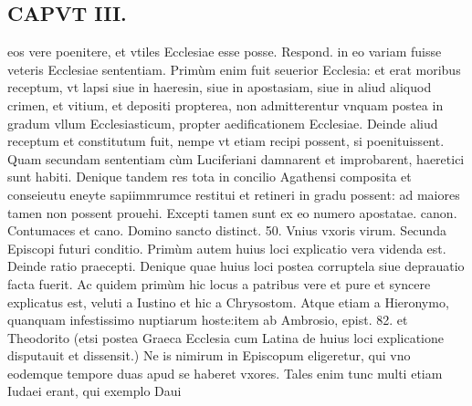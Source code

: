 \documentclass{article}
\begin{document}
\begin{pages}
\section*{CAPVT  III. }
\marginpar{[ p.105 ]}\pstart eos vere poenitere, et vtiles Ecclesiae esse posse. Respond. in eo variam fuisse veteris Ecclesiae sententiam. Primùm enim fuit seuerior Ecclesia: et erat moribus receptum, vt lapsi siue in haeresin, siue in apostasiam, siue in aliud aliquod crimen, et vitium, et depositi propterea, non admitterentur vnquam postea in gradum vllum Ecclesiasticum, propter aedificationem Ecclesiae. Deinde aliud receptum et constitutum fuit, nempe vt etiam recipi possent, si poenituissent. Quam secundam sententiam cùm Luciferiani damnarent et improbarent, haeretici sunt habiti. Denique tandem res tota in concilio Agathensi composita et conseieutu eneyte sapiimmrumce restitui et retineri in gradu possent: ad maiores tamen non possent prouehi. Excepti tamen sunt ex eo numero apostatae. canon. Contumaces et cano. Domino sancto distinct. 50.  \pend\pstart Vnius vxoris virum. Secunda Episcopi futuri conditio. Primùm autem huius loci explicatio vera videnda est. Deinde ratio praecepti. Denique  quae huius loci postea corruptela siue deprauatio facta fuerit.  \pend\pstart Ac quidem primùm hic locus a patribus vere et pure et syncere explicatus est, veluti a Iustino et hic a Chrysostom. Atque etiam a Hieronymo, quanquam infestissimo nuptiarum hoste:item ab Ambrosio, epist. 82. et Theodorito (etsi postea Graeca Ecclesia cum Latina de huius loci explicatione disputauit et dissensit.) Ne is nimirum in Episcopum eligeretur, qui vno eodemque tempore duas apud se haberet vxores. Tales enim tunc multi etiam Iudaei erant, qui exemplo Daui\pend

\end{pages}
\end{document}
